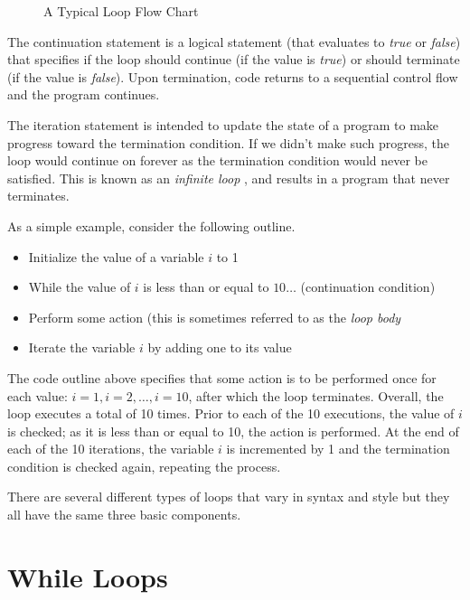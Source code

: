 \begin{figure}
\centering

\caption{A Typical Loop Flow Chart}
\label{figure:loopFlowChart}
\end{figure}

The continuation statement is a logical statement (that evaluates to \emph{true} or \emph{false})
that specifies if the loop should continue (if the value is \emph{true}) or should terminate
(if the value is \emph{false}).  Upon termination, code returns to a sequential control flow and
the program continues.  

The iteration statement is intended to update the state of a program to make progress
toward the termination condition.  If we didn't make such progress, the loop would continue
on forever as the termination condition would never be satisfied.  This is known as an 
\emph{infinite loop} , and results in a program that never terminates.

As a simple example, consider the following outline.

\begin{itemize}
  \item Initialize the value of a variable $i$ to 1
  \item While the value of $i$ is less than or equal to $10\ldots$ (continuation condition)
  \item Perform some action (this is sometimes referred to as the \emph{loop body}
  \item Iterate the variable $i$ by adding one to its value
\end{itemize}

The code outline above specifies that some action is to be performed once for
each value: $i=1, i=2, \ldots, i=10$, after which the loop terminates.  Overall, the
loop executes a total of 10 times.  Prior to each of the 10 executions, the value of $i$
is checked; as it is less than or equal to 10, the action is performed.  At the end of
each of the 10 iterations, the variable $i$ is incremented by 1 and the termination
condition is checked again, repeating the process.

There are several different types of loops that vary in syntax and style but they 
all have the same three basic components. 

\section{While Loops}

